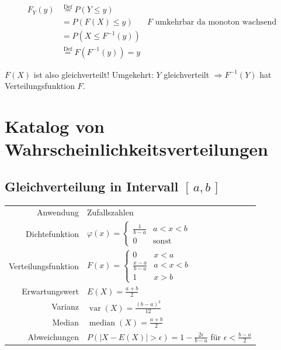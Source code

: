 \documentclass[10pt,a4paper]{scrartcl}
\DeclareMathOperator{\var}{var}
\DeclareMathOperator{\median}{median}
\begin{document}
\begin{align*}
  F_Y(y) & \stackrel{\text{Def}}{=} P(Y \le y) \\
         & = P(F(X) \le y)  & F \text{ umkehrbar da monoton wachsend} \\
         & = P(X \le F^{-1}(y)) \\
         & \stackrel{\text{Def}}{=} F(F^{-1}(y)) = y 
\end{align*}

$F(X)$ ist also gleichverteilt!
Umgekehrt: $Y$ gleichverteilt $\Rightarrow F^{-1}(Y)$ hat Verteilungsfunktion $F$.

\section{Katalog von Wahrscheinlichkeitsverteilungen}
\newlength{\katalogSpaltezwei}
\setlength{\katalogSpaltezwei}{11.5cm}

\subsection{Gleichverteilung in Intervall $[\,a, b\,]$}
\begin{tabular}{r p{\katalogSpaltezwei}}
Anwendung & Zufallszahlen \\
Dichtefunktion & $\varphi(x) = \begin{cases}\frac{1}{b-a} & a < x < b \\ 0 & \text{sonst} \end{cases} $ \\
Verteilungsfunktion & $F(x) = \begin{cases}0 & x < a \\ \frac{x-a}{b-a} & a < x < b \\ 1 & x > b\end{cases} $ \\
Erwartungswert & $E(X) = \frac{a+b}{2}$ \\
Varianz & $\var(X) = \frac{(b-a)^2}{12}$ \\
Median & $ \median(X) = \frac{a+b}{2} $ \\
Abweichungen & $P(|X - E(X)| > \epsilon) = 1 - \frac{2\epsilon}{b-a}$ für $\epsilon < \frac{b-a}{2}$
\end{tabular}
\end{document}

